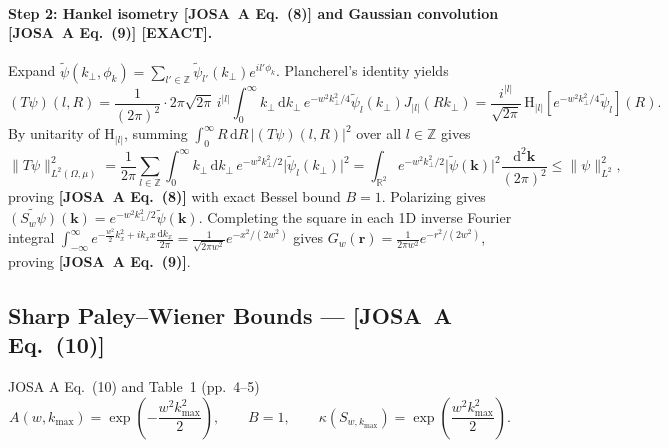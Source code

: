 \documentclass[10pt,letterpaper]{article}
\newcommand{\norm}[1]{\lVert #1 \rVert}
\newcommand{\abs}[1]{\lvert #1 \rvert}
\newcommand{\dd}{\mathrm{d}}
\newcommand{\josa}[1]{\textbf{[JOSA~A Eq.~(#1)]}}
\newcommand{\tagexact}{\textcolor{forest}{\textbf{[EXACT]}}}
\numberwithin{equation}{section}
\begin{document}
\paragraph*{Step 2: Hankel isometry \josa{8} and Gaussian convolution \josa{9} \tagexact{}.}
Expand $\widetilde{\psi}(k_\perp,\phi_k) = \sum_{l'\in\mathbb{Z}}\widetilde{\psi}_{l'}(k_\perp) e^{il'\phi_k}$. Plancherel's identity yields
\begin{equation}
  (T\psi)(l,R) = \frac{1}{(2\pi)^2}\cdot 2\pi\sqrt{2\pi}\,i^{\abs{l}}\int_0^\infty k_\perp\,\dd k_\perp\,e^{-w^2 k_\perp^2/4}\widetilde{\psi}_l(k_\perp) J_{\abs{l}}(Rk_\perp) = \frac{i^{\abs{l}}}{\sqrt{2\pi}}\,\mathrm{H}_{\abs{l}}\!\left[e^{-w^2 k_\perp^2/4}\widetilde{\psi}_l\right](R).
\end{equation}
By unitarity of $\mathrm{H}_{\abs{l}}$, summing $\int_0^\infty R\,\dd R\,\abs{(T\psi)(l,R)}^2$ over all $l \in \mathbb{Z}$ gives
\begin{equation}
  \norm{T\psi}_{L^2(\Omega,\mu)}^2 = \frac{1}{2\pi}\sum_{l\in\mathbb{Z}}\int_0^\infty k_\perp\,\dd k_\perp\,e^{-w^2 k_\perp^2/2}\abs{\widetilde{\psi}_l(k_\perp)}^2 = \int_{\mathbb{R}^2} e^{-w^2 k_\perp^2/2}\abs{\widetilde{\psi}(\mathbf{k})}^2\frac{\dd^2\mathbf{k}}{(2\pi)^2} \le \norm{\psi}_{L^2}^2,
\end{equation}
proving \josa{8} with exact Bessel bound $B = 1$. Polarizing gives $\widetilde{(S_w\psi)}(\mathbf{k}) = e^{-w^2 k_\perp^2/2}\widetilde{\psi}(\mathbf{k})$. Completing the square in each 1D inverse Fourier integral $\int_{-\infty}^\infty e^{-\frac{w^2}{2}k_x^2 + ik_x x}\frac{\dd k_x}{2\pi} = \frac{1}{\sqrt{2\pi w^2}}e^{-x^2/(2w^2)}$ gives $G_w(\mathbf{r}) = \frac{1}{2\pi w^2}e^{-r^2/(2w^2)}$, proving \josa{9}.

\subsection{Sharp Paley--Wiener Bounds --- \josa{10}}

\begin{targeteq}{JOSA A Eq.~(10) and Table~1 (pp.~4--5)}
\[
  A(w,k_{\max}) = \exp\!\left(-\frac{w^2 k_{\max}^2}{2}\right), \qquad B = 1, \qquad \kappa(S_{w,k_{\max}}) = \exp\!\left(\frac{w^2 k_{\max}^2}{2}\right).
\]
\end{targeteq}
\end{document}
